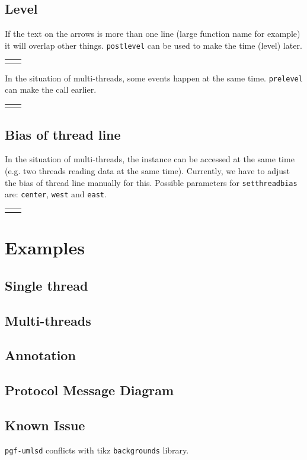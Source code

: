 \documentclass{article}
\newcommand{\demo}[2][1]{
  \begin{center}
  \begin{tabular}{cc}
    \begin{minipage}{.49\linewidth}
      \centering
      \resizebox{#1\linewidth}{!}{
        
      }
    \end{minipage}
    &
    \begin{minipage}{.45\linewidth}
      
    \end{minipage}
  \end{tabular}
  \end{center}
}
\newcommand{\example}[2][1]{
  \begin{center}  
    \resizebox{#1\linewidth}{!}{
      
    }
  \end{center}
  
}
\begin{document}
\subsection{Level}
If the text on the arrows is more than one line (large function name
for example) it will overlap other things. \texttt{postlevel} can be
used to make the time (level) later.

\demo[0.6]{postlevel}

In the situation of multi-threads, some events happen at the same
time. \texttt{prelevel} can make the call earlier.

\demo[0.6]{prelevel}

\subsection{Bias of thread line}
In the situation of multi-threads, the instance can be accessed at the
same time (e.g. two threads reading data at the same time). Currently,
we have to adjust the bias of thread line manually for this. Possible
parameters for \texttt{setthreadbias} are: \texttt{center},
\texttt{west} and \texttt{east}.

\demo[0.8]{threadbias}

\section{Examples}
\subsection{Single thread}
\example[0.8]{single-thread-example}

\subsection{Multi-threads}
\example[0.8]{multi-threads-example}

\subsection{Annotation}
\example[0.5]{sync-clock}

\subsection{Protocol Message Diagram}
\example[0.8]{protocol-message-diagram}

\subsection{Known Issue}
\texttt{pgf-umlsd} conflicts with tikz \texttt{backgrounds} library.
\end{document}
